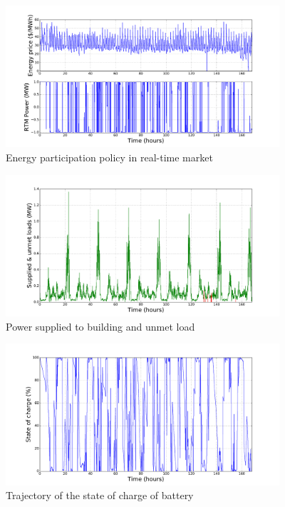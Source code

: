 \documentclass[11pt,twoside]{article}
\begin{document}
\begin{figure}[h!]
\begin{center}
\includegraphics[width=4in]{Figures/Plots/fullproblem_det/Prtm_fp_dt.pdf} \caption{Energy participation policy in real-time market}\label{Prtm_fp_dt}\end{center}
\end{figure}
\begin{figure}[h!]
\begin{center}
\includegraphics[width=4in]
{Figures/Plots/fullproblem_det/supp_unmet_fp_dt.pdf} \caption{Power supplied to building and unmet load}\label{supp_unmet_fp_dt}\end{center}
\end{figure}
\begin{figure}[h!]
\begin{center}
\includegraphics[width=4in]
{Figures/Plots/fullproblem_det/soc_fp_dt.pdf} \caption{Trajectory of the state of charge of battery}\label{soc_fp_dt}\end{center}
\end{figure}
\end{document}
